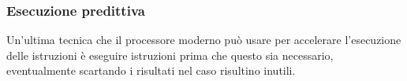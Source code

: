 \documentclass[a4paper,11pt]{article}
\begin{document}
\subsubsection{Esecuzione predittiva}
Un'ultima tecnica che il processore moderno può usare per accelerare l'esecuzione delle istruzioni è eseguire istruzioni prima che questo sia necessario, eventualmente scartando i risultati nel caso risultino inutili. 
\end{document}
